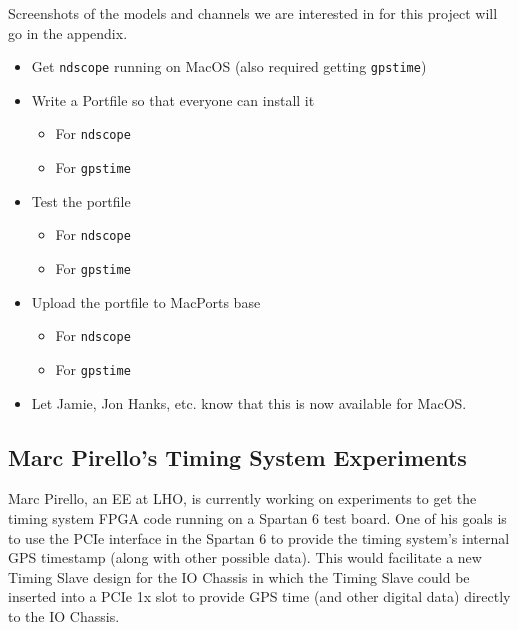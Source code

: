 \documentclass{article}
\newcommand*{\TODO}{\textcolor{todo}}
\begin{document}
\TODO{Screenshots of the models and channels we are interested in for this project will go in the appendix.}

\begin{itemize}
    \item Get \texttt{ndscope} running on MacOS (also required getting \texttt{gpstime})
    \item \TODO{Write a Portfile so that everyone can install it}
        \begin{itemize}
            \item \TODO{For \texttt{ndscope}}
            \item \TODO{For \texttt{gpstime}}
        \end{itemize}
    \item \TODO{Test the portfile}
        \begin{itemize}
            \item \TODO{For \texttt{ndscope}}
            \item \TODO{For \texttt{gpstime}}
        \end{itemize}
    \item \TODO{Upload the portfile to MacPorts base}
        \begin{itemize}
            \item \TODO{For \texttt{ndscope}}
            \item \TODO{For \texttt{gpstime}}
        \end{itemize}
    \item \TODO{Let Jamie, Jon Hanks, etc. know that this is now available for MacOS.}
\end{itemize}

\subsection{\label{sec:marc-pirello}Marc Pirello's Timing System Experiments}

Marc Pirello, an EE at LHO, is currently working on experiments to get the timing system FPGA code running on a Spartan 6 test board. One of his goals is to use the PCIe interface in the Spartan 6 to provide the timing system's internal GPS timestamp (along with other possible data). This would facilitate a new Timing Slave design for the IO Chassis in which the Timing Slave could be inserted into a PCIe 1x slot to provide GPS time (and other digital data) directly to the IO Chassis.
\end{document}
